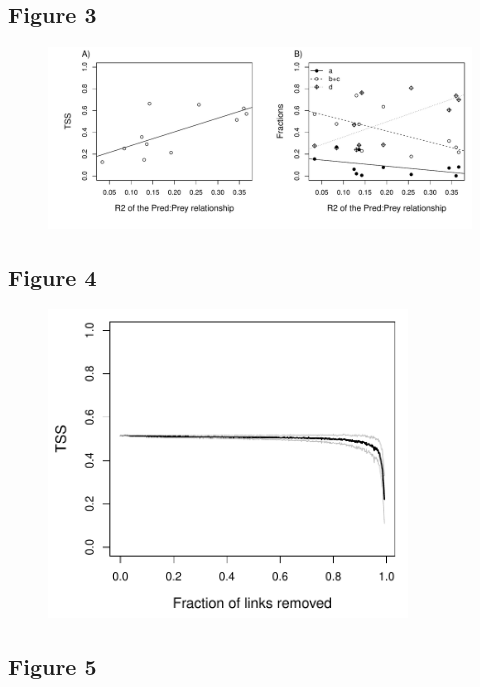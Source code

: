 \documentclass[12pt]{article}
\begin{document}
\newpage
\subsection*{Figure 3}

\begin{figure}[ht!]
	\centering\includegraphics[width=1\textwidth]{TSS_perweb.pdf}
\end{figure}

\newpage
\subsection*{Figure 4}

\begin{figure}[ht!]
	\centering\includegraphics[width=0.85\textwidth]{TSS_sampling.pdf}
\end{figure}

\newpage
\subsection*{Figure 5}
\end{document}
